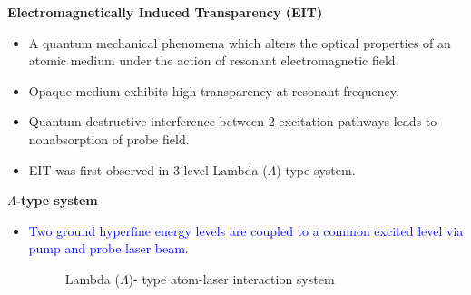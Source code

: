 \documentclass[9pt,aspectratio94]{beamer}
\begin{document}
\begin{frame}{\textbf {Electromagnetically Induced Transparency (EIT)}}
  \begin{itemize}
      \item A quantum mechanical phenomena which alters the optical properties of an atomic medium under the action of resonant electromagnetic field.
      \item Opaque medium exhibits high transparency at resonant frequency.
      \item Quantum destructive interference between 2 excitation pathways leads to nonabsorption of probe field.
      \item EIT was first observed in 3-level Lambda ($\Lambda$) type system.
      
  \end{itemize}
  

\end{frame}

\begin{frame}{\textbf{$\Lambda$-type system }}
\begin{itemize}
    \item \textcolor{blue}{Two ground hyperfine energy levels are coupled to a common excited level via pump and probe laser beam.}
    \vspace{5mm}
    \begin{center}
    \begin{tcolorbox}[width=9cm, colback=yellow!3!white]
     \begin{figure}[ht]
     \centering
     \caption{Lambda ($\Lambda$)- type atom-laser interaction system}
     \label{fig:lambda}
     \end{figure}
     \end{tcolorbox}
     \end{center}
     \end{itemize}
     \end{frame}
\end{document}
